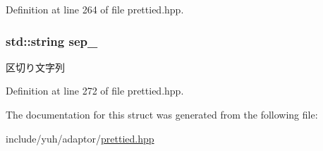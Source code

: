 \-Definition at line 264 of file prettied.\-hpp.

\hypertarget{structyuh_1_1range__detail_1_1pretty__forwarder_ae5b41e2a505b540f0b9a6e995030bcba}{
\subsubsection[{sep\-\_\-}]{\setlength{\rightskip}{0pt plus 5cm}std\-::string {\bf sep\-\_\-}}}\label{db/d79/structyuh_1_1range__detail_1_1pretty__forwarder_ae5b41e2a505b540f0b9a6e995030bcba}
区切り文字列 

\-Definition at line 272 of file prettied.\-hpp.



\-The documentation for this struct was generated from the following file\-:\begin{DoxyCompactItemize}
\item 
include/yuh/adaptor/\hyperlink{prettied_8hpp}{prettied.\-hpp}\end{DoxyCompactItemize}
